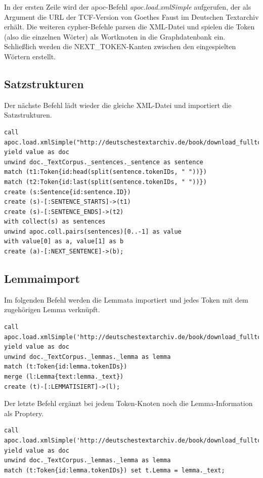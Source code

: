 \documentclass[ngerman,]{scrreprt}
\begin{document}
In der ersten Zeile wird der apoc-Befehl \emph{apoc.load.xmlSimple} aufgerufen, der als Argument die URL der TCF-Version von Goethes Faust im Deutschen Textarchiv erhält. Die weiteren cypher-Befehle parsen die XML-Datei und spielen die Token (also die einzelnen Wörter) als Wortknoten in die Graphdatenbank ein. Schließlich werden die NEXT\_TOKEN-Kanten zwischen den eingespielten Wörtern erstellt.

\subsection{Satzstrukturen}\label{satzstrukturen}

Der nächste Befehl lädt wieder die gleiche XML-Datei und importiert die Satzstrukturen.

\begin{verbatim}
call apoc.load.xmlSimple("http://deutschestextarchiv.de/book/download_fulltcf/16181") yield value as doc
unwind doc._TextCorpus._sentences._sentence as sentence
match (t1:Token{id:head(split(sentence.tokenIDs, " "))})
match (t2:Token{id:last(split(sentence.tokenIDs, " "))})
create (s:Sentence{id:sentence.ID})
create (s)-[:SENTENCE_STARTS]->(t1)
create (s)-[:SENTENCE_ENDS]->(t2)
with collect(s) as sentences
unwind apoc.coll.pairs(sentences)[0..-1] as value
with value[0] as a, value[1] as b
create (a)-[:NEXT_SENTENCE]->(b);
\end{verbatim}

\subsection{Lemmaimport}\label{lemmaimport}

Im folgenden Befehl werden die Lemmata importiert und jedes Token mit dem zugehörigen Lemma verknüpft.

\begin{verbatim}
call apoc.load.xmlSimple('http://deutschestextarchiv.de/book/download_fulltcf/16181') yield value as doc
unwind doc._TextCorpus._lemmas._lemma as lemma
match (t:Token{id:lemma.tokenIDs})
merge (l:Lemma{text:lemma._text})
create (t)-[:LEMMATISIERT]->(l);
\end{verbatim}

Der letzte Befehl ergänzt bei jedem Token-Knoten noch die Lemma-Information als Proptery.

\begin{verbatim}
call apoc.load.xmlSimple('http://deutschestextarchiv.de/book/download_fulltcf/16181') yield value as doc
unwind doc._TextCorpus._lemmas._lemma as lemma
match (t:Token{id:lemma.tokenIDs}) set t.Lemma = lemma._text;
\end{verbatim}
\end{document}
